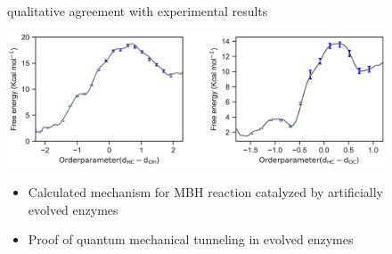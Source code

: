 \documentclass{beamer}
\begin{document}
\begin{frame}
\begin{center}
\begin{figure}
\begin{overprint}
\begin{itemize}
        qualitative agreement with experimental results
    \end{itemize}
    \begin{center}
    \includegraphics[scale=0.5]{figures/mbhase_merge.png}
    \end{center}
    \begin{itemize}
        \item Calculated mechanism for MBH reaction catalyzed by artificially evolved enzymes
        \item Proof of quantum mechanical tunneling in evolved enzymes
    \end{itemize}
\end{overprint}
\end{figure}
\end{center}
\end{frame}
\end{document}
